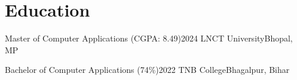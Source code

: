 \section{Education}
\vspace{2pt}

\resumeSubHeadingListStart

\resumeSubheading
{Master of Computer Applications (CGPA: 8.49)}{2024}
{LNCT University}{Bhopal, MP}

\resumeSubheading
{Bachelor of Computer Applications (74\%)}{2022}
{TNB College}{Bhagalpur, Bihar}

\resumeSubHeadingListEnd